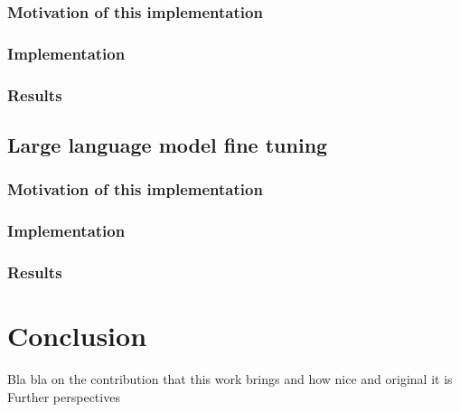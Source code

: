 \documentclass{article}
\begin{document}
    \subsubsection{Motivation of this implementation}

    \subsubsection{Implementation}

    \subsubsection{Results}

    \subsection{Large language model fine tuning}\label{subsec:large-language-model-finetuning}

    \subsubsection{Motivation of this implementation}

    \subsubsection{Implementation}

    \subsubsection{Results}


    \section{Conclusion}\label{sec:conclusion}
    Bla bla on the contribution that this work brings and how nice and original it is
    Further perspectives


    
    
\end{document}
